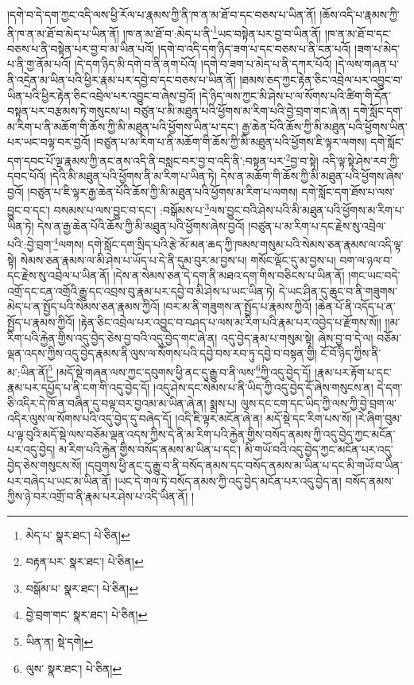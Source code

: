 །དགེ་བ་དེ་དག་ཀྱང་འདི་ལས་ཕྱི་རོལ་པ་རྣམས་ཀྱི་ནི་ཁ་ན་མ་ཐོ་བ་དང་བཅས་པ་ཡིན་ནོ། །ཆོས་འདི་པ་རྣམས་ཀྱི་ནི་ཁ་ན་མ་ཐོ་བ་མེད་པ་ཡིན་ནོ། །ཁ་ན་མ་ཐོ་བ་:མེད་པ་ནི་\footnote{མེད་པ་  སྣར་ཐང་།  པེ་ཅིན། }ཡང་བསྟེན་པར་བྱ་བ་ཡིན་ནོ། །ཁ་ན་མ་ཐོ་བ་དང་བཅས་པ་ནི་བསྟེན་པར་བྱ་བ་མ་ཡིན་པའོ། །དགེ་བ་འདི་དག་ཉིད་ཟག་པ་དང་བཅས་པ་ནི་ངན་པའོ། །ཟག་པ་མེད་པ་ནི་གྱ་ནོམ་པའོ། །དེ་དག་ཉིད་མི་དགེ་བ་ནི་ནག་པོའོ། །དགེ་བ་ཟག་པ་མེད་པ་ནི་དཀར་པོའོ། །དེ་ལས་གཞན་པ་ནི་འདྲེན་མ་ཡིན་པའི་ཕྱིར་རྣམ་པར་དབྱེ་བ་དང་བཅས་པ་ཡིན་ནོ། །ཐམས་ཅད་ཀྱང་རྟེན་ཅིང་འབྲེལ་པར་འབྱུང་བ་ཡིན་པའི་ཕྱིར་རྟེན་ཅིང་འབྲེལ་པར་འབྱུང་བ་ཞེས་བྱའོ། །དེ་ཉིད་ལས་ཀྱང་མི་ཤེས་པ་ལ་སོགས་པའི་ཚིག་གི་དོན་བསྟན་པར་བརྩམས་ཏེ་གསུངས་པ། བཙུན་པ་མི་མཐུན་པའི་ཕྱོགས་མ་རིག་པའི་བྱེ་བྲག་གང་ཞེ་ན། དགེ་སློང་དག་མ་རིག་པ་ནི་མཆོག་གི་ཆོས་ཀྱི་མི་མཐུན་པའི་ཕྱོགས་ཡིན་པ་དང་། རྒྱ་ཆེན་པོའི་ཆོས་ཀྱི་མི་མཐུན་པའི་ཕྱོགས་ཡིན་པར་ཡང་བལྟ་བར་བྱའོ། །བཙུན་པ་མ་རིག་པ་ནི་མཆོག་གི་ཆོས་ཀྱི་མི་མཐུན་པའི་ཕྱོགས་ཇི་ལྟར་ལགས། དགེ་སློང་དག་དབང་པོ་ལྔ་རྣམས་ཀྱི་ནང་ནས་འདི་ནི་བསླང་བར་བྱ་བ་འདི་ནི་:བསྟན་པར་\footnote{བརྟན་པར་  སྣར་ཐང་།  པེ་ཅིན། }བྱ་བ་སྟེ། འདི་ལྟ་སྟེ་ཤེས་རབ་ཀྱི་དབང་པོའོ། །དེའི་མི་མཐུན་པའི་ཕྱོགས་ནི་མ་རིག་པ་ཡིན་ཏེ། དེས་ན་མཆོག་གི་ཆོས་ཀྱི་མི་མཐུན་པའི་ཕྱོགས་ཞེས་བྱའོ། །བཙུན་པ་ཇི་ལྟར་རྒྱ་ཆེན་པོའི་ཆོས་ཀྱི་མི་མཐུན་པའི་ཕྱོགས་མ་རིག་པ་ལགས། དགེ་སློང་དག་ཐོས་པ་ལས་བྱུང་བ་དང་། བསམས་པ་ལས་བྱུང་བ་དང་། :བསྒོམས་པ་\footnote{བསྒོམ་པ་  སྣར་ཐང་།  པེ་ཅིན། }ལས་བྱུང་བའི་ཤེས་པའི་མི་མཐུན་པའི་ཕྱོགས་མ་རིག་པ་ཡིན་ཏེ། དེས་ན་རྒྱ་ཆེན་པོའི་ཆོས་ཀྱི་མི་མཐུན་པའི་ཕྱོགས་ཞེས་བྱའོ། །བཙུན་པ་མ་རིག་པ་དང་རྗེས་སུ་འབྲེལ་པའི་:བྱེ་བྲག་\footnote{བྱེ་བྲག་གང་  སྣར་ཐང་།  པེ་ཅིན། }ལགས། དགེ་སློང་དག་སྲིད་པའི་རྩེ་མོ་མན་ཆད་ཀྱི་ཁམས་གསུམ་པའི་སེམས་ཅན་རྣམས་ལ་འདི་ལྟ་སྟེ། སེམས་ཅན་རྣམས་ལ་མི་ཤེས་པ་ཡོད་པ་དེ་ནི་དུམ་བུར་མ་བྱས་པ། གསོང་ལྡོང་དུ་མ་བྱས་པ། བག་ལ་ཉལ་བ་དང་རྗེས་སུ་འབྲེལ་པ་ཡིན་ནོ། །དེས་ན་སེམས་ཅན་དེ་དག་ནི་མཐའ་དག་གིས་བཅིངས་པ་ཡིན་ནོ། །གང་ཡང་བདེ་འགྲོ་དང་ངན་འགྲོའི་རྒྱུ་དང་འབྲས་བུ་རྣམ་པར་དབྱེ་བ་མི་ཤེས་པ་ཡང་ཡིན་ཏེ། དེ་ཡང་ཤིན་དུ་ཆུང་བ་ནི་གཟུགས་མེད་པ་ན་སྤྱོད་པའི་སེམས་ཅན་རྣམས་ཀྱིའོ། །བར་མ་ནི་གཟུགས་ན་སྤྱོད་པ་རྣམས་ཀྱིའོ། །ཆེན་པོ་ནི་འདོད་པ་ན་སྤྱོད་པ་རྣམས་ཀྱིའོ། །རྟེན་ཅིང་འབྲེལ་པར་འབྱུང་བ་བཤད་པ་ལས་མ་རིག་པའི་རྣམ་པར་འབྱེད་པ་རྫོགས་སོ།། །།མ་རིག་པའི་རྐྱེན་གྱིས་འདུ་བྱེད་ཅེས་བྱ་བའི་འདུ་བྱེད་གང་ཞེ་ན། འདུ་བྱེད་རྣམ་པ་གསུམ་སྟེ། ཞེས་བྱ་བ་དེ་ལ། བཅོམ་ལྡན་འདས་ཀྱིས་འདུ་བྱེད་རྣམས་ནི་ལུས་ལ་སོགས་པའི་དབྱེ་བས་རབ་ཏུ་དབྱེ་བ་བསྟན་གྱི། ངོ་བོ་ཉིད་ཀྱིས་ནི་མ་:ཡིན་ནོ།\footnote{ཡིན་ན།  སྡེ་དགེ། } །མདོ་སྡེ་གཞན་ལས་ཀྱང་དབུགས་ཕྱི་ནང་དུ་རྒྱུ་བ་ནི་ལས་\footnote{ལུས་  སྣར་ཐང་།  པེ་ཅིན། }ཀྱི་འདུ་བྱེད་དོ། །རྣམ་པར་རྟོག་པ་དང་རྣམ་པར་དཔྱོད་པ་ནི་ངག་གི་འདུ་བྱེད་དོ། །འདུ་ཤེས་དང་སེམས་པ་ནི་ཡིད་ཀྱི་འདུ་བྱེད་དོ་ཞེས་གསུངས་ན། དེ་དག་ཅི་འདིར་དེ་ཁོ་ན་བཞིན་དུ་བལྟ་བར་བྱའམ་མ་ཡིན་ཞེ་ན། སྨྲས་པ། ལུས་དང་ངག་དང་ཡིད་ཀྱི་ལས་ཀྱི་བྱེ་བྲག་ལ་འདིར་ལུས་ལ་སོགས་པའི་འདུ་བྱེད་དུ་བཞེད་དོ། །འདི་ཇི་ལྟར་མངོན་ཞེ་ན། མདོ་སྡེ་དང་རིག་པས་སོ། །རེ་ཞིག་བུམ་པ་ལྟ་བུའི་མདོ་སྡེ་ལས་བཅོམ་ལྡན་འདས་ཀྱིས་དེ་ནི་མ་རིག་པའི་རྐྱེན་གྱིས་བསོད་ནམས་ཀྱི་འདུ་བྱེད་ཀྱང་མངོན་པར་འདུ་བྱེད། མ་རིག་པའི་རྐྱེན་གྱིས་བསོད་ནམས་མ་ཡིན་པ་དང་། མི་གཡོ་བའི་འདུ་བྱེད་ཀྱང་མངོན་པར་འདུ་བྱེད་ཅེས་གསུངས་སོ། །དབུགས་ཕྱི་ནང་དུ་རྒྱུ་བ་ནི་བསོད་ནམས་དང་བསོད་ནམས་མ་ཡིན་པ་དང་མི་གཡོ་བ་ཡིན་པར་བཞེད་པ་ཡང་མ་ཡིན་ནོ། །ཡང་དེ་གལ་ཏེ་བསོད་ནམས་ཀྱི་འདུ་བྱེད་མངོན་པར་འདུ་བྱེད་ན། བསོད་ནམས་ཀྱིས་ཉེ་བར་འགྲོ་བ་ནི་རྣམ་པར་ཤེས་པ་འདི་ཡིན་ནོ། །
